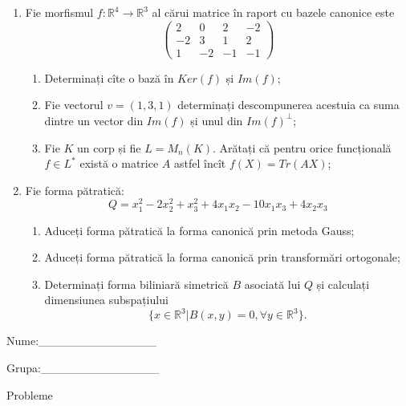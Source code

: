 \documentclass{article}
\begin{document}
\begin{enumerate}
 \item Fie morfismul $f:\mathbb{R}^4 \to \mathbb{R}^3$ al cărui matrice în raport cu bazele canonice este
$$\begin{pmatrix}
2&0&2&-2\\
-2&3&1&2\\
1&-2&-1&-1
\end{pmatrix}$$

\begin{enumerate}
\item Determinați cîte o bază în $Ker(f)$ și $Im(f)$;
\item Fie vectorul $v=(1,3,1)$ determinați descompunerea acestuia ca suma dintre un vector din $Im(f)$ și unul din $Im(f)^\perp$;
\item Fie $K$ un corp și fie $L=M_n(K)$. Arătați că pentru orice funcțională $f \in L^*$ există o matrice $A$ astfel încît $f(X)=Tr(AX)$;
\end{enumerate}
\item Fie forma pătratică:
$$Q= x_1^2-2x_2^2+x_3^2+4x_1x_2-10x_1x_3+4x_2x_3$$

\begin{enumerate}
\item Aduceți forma pătratică la forma canonică prin metoda Gauss;
\item Aduceți forma pătratică la forma canonică prin transformări ortogonale;
\item Determinați forma biliniară simetrică $B$ asociată lui $Q$ și calculați dimensiunea subspațiului
$$\{x \in \mathbb{R}^3 | B(x,y)=0,\forall y \in \mathbb{R}^3\}.$$

\end{enumerate}
\end{enumerate}
\newpage
\begin{flushright}
Nume:\_\_\_\_\_\_\_\_\_\_\_\_\_\_
 
 
Grupa:\_\_\_\_\_\_\_\_\_\_\_\_\_\_
\end{flushright}
\begin{center}
\vspace{2cm}
{\Large Probleme}
\vspace{2cm}
\end{center}
\end{document}
